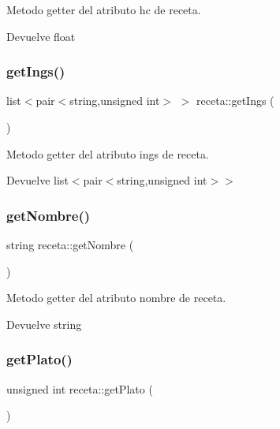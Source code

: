 Metodo getter del atributo hc de receta. 

\begin{DoxyReturn}{Devuelve}
float 
\end{DoxyReturn}
\mbox{\label{classreceta_aa9409169414a4ed26c1a95c515b6d541}} 
\subsubsection{\texorpdfstring{get\+Ings()}{getIngs()}}
{\footnotesize\ttfamily list$<$pair$<$string,unsigned int$>$ $>$ receta\+::get\+Ings (\begin{DoxyParamCaption}{ }\end{DoxyParamCaption})}



Metodo getter del atributo ings de receta. 

\begin{DoxyReturn}{Devuelve}
list$<$pair$<$string,unsigned int$>$$>$ 
\end{DoxyReturn}
\mbox{\label{classreceta_a1d19b209a379c7c94214829337a74794}} 
\subsubsection{\texorpdfstring{get\+Nombre()}{getNombre()}}
{\footnotesize\ttfamily string receta\+::get\+Nombre (\begin{DoxyParamCaption}{ }\end{DoxyParamCaption})}



Metodo getter del atributo nombre de receta. 

\begin{DoxyReturn}{Devuelve}
string 
\end{DoxyReturn}
\mbox{\label{classreceta_a735543a36eae6f38505b55acbfa1e8c3}} 
\subsubsection{\texorpdfstring{get\+Plato()}{getPlato()}}
{\footnotesize\ttfamily unsigned int receta\+::get\+Plato (\begin{DoxyParamCaption}{ }\end{DoxyParamCaption})}




